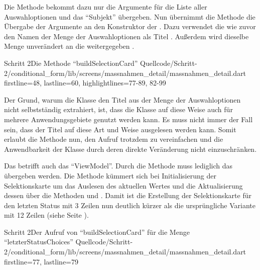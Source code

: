 \clearpage
Die Methode  bekommt dazu nur die Argumente für die Liste aller Auswahloptionen 
und das \enquote{Subjekt}   übergeben.
Nun übernimmt die Methode die Übergabe der Argumente an den Konstruktor der  .
Dazu verwendet die  wie zuvor den Namen der Menge der Auswahloptionen als Titel .
Außerdem wird dieselbe Menge unverändert an die  weitergegeben .

\begin{alexlisting}{Schritt 2}{Die Methode \enquote{buildSelectionCard}}
  {Quellcode/Schritt-2/conditional_form/lib/screens/massnahmen_detail/massnahmen_detail.dart}
  {firstline=48, lastline=60, highlightlines={77-89, 82-99}}
  \label{lst:Schritt2MassnahmencharakteristikaSelektionskartenWerdenErgaenzt}
\end{alexlisting}

Der Grund, warum die Klasse  den Titel aus der Menge der Auswahloptionen nicht selbstständig extrahiert, ist, dass die Klasse auf diese Weise auch für mehrere Anwendungsgebiete genutzt werden kann.
Es muss nicht immer der Fall sein, dass der Titel auf diese Art und Weise ausgelesen werden kann.
Somit erlaubt die Methode  nun, den Aufruf trotzdem zu vereinfachen und die Anwendbarkeit der Klasse  durch deren direkte Veränderung nicht einzuschränken.

Das betrifft auch das \enquote{ViewModel}.
Durch die Methode  muss lediglich das  übergeben werden.
Die Methode kümmert sich bei Initialisierung der Selektionskarte um das Auslesen des aktuellen Wertes  und die Aktualisierung dessen über die Methoden   und  .
Damit ist die Erstellung der Selektionskarte für den letzten Status mit 3 Zeilen \Lst{\ref{lst:Schritt2BuildSelectionCardLetzterStatusChoices}} nun deutlich kürzer als die ursprüngliche Variante mit 12 Zeilen (siehe Seite \pageref{lst:Schritt1AusgabeDerFormularfelder}).

\begin{alexlisting}{Schritt 2}{Der Aufruf von \enquote{buildSelectionCard} für die Menge \enquote{letzterStatusChoices}}
  {Quellcode/Schritt-2/conditional_form/lib/screens/massnahmen_detail/massnahmen_detail.dart}
  {firstline=77, lastline=79}
  \label{lst:Schritt2BuildSelectionCardLetzterStatusChoices}
\end{alexlisting}

